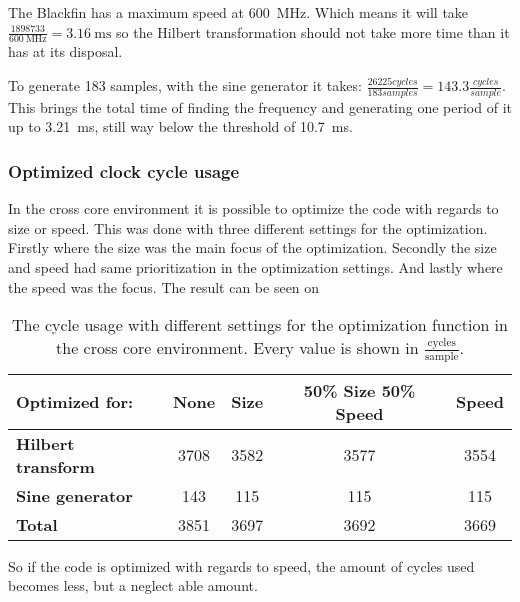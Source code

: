 The Blackfin has a maximum speed at \SI{600}{\mega\hertz}.
Which means it will take $\frac{\num{1898733}}{\SI{600}{\mega\hertz}} = {\SI{3.16}{\milli\second}}$ so the Hilbert transformation should not take more time than it has at its disposal.

To generate 183 samples, with the sine generator it takes: $\frac{\num{26225} cycles}{183 samples} = \num{143.3}\frac{cycles}{sample}$.
This brings the total time of finding the frequency and generating one period of it up to \SI{3.21}{\milli\second}, still way below the threshold of \SI{10.7}{\milli\second}.

\subsubsection{Optimized clock cycle usage}
In the cross core environment it is possible to optimize the code with regards to size or speed.
This was done with three different settings for the optimization. 
Firstly where the size was the main focus of the optimization. 
Secondly the size and speed had same prioritization in the optimization settings.
And lastly where the speed was the focus. The result can be seen on
\begin{table}
	\centering
	\begin{tabularx}{0.95\textwidth}{l c c c c}
		\toprule
		{\textbf{Optimized for:}} & \textbf{None} & \textbf{Size} & \textbf{50\% Size 50\% Speed} & \textbf{Speed} \\
		\midrule
		\textbf{Hilbert transform} & \num{3708} & \num{3582} & \num{3577} & \num{3554} \\
		\textbf{Sine generator} & \num{143} & \num{115} & \num{115} & \num{115} \\
		\textbf{Total} & \num{3851} & \num{3697} & \num{3692} & \num{3669} \\
		\bottomrule
	\end{tabularx}
	\caption{The cycle usage with different settings for the optimization function in the cross core environment. Every value is shown in $\frac{\text{cycles}}{\text{sample}}$.}
	\label{OptimizedCycleUsage}
\end{table}

So if the code is optimized with regards to speed, the amount of cycles used becomes less, but a neglect able amount.  

\FloatBarrier